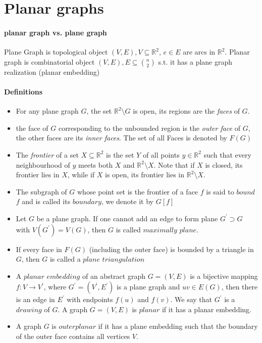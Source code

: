 \section{Planar graphs}

\paragraph{planar graph vs. plane graph}
Plane Graph is topological object $ (V,E), V \subseteq \mathbb{R}^2$, 
$ e \in E $ are arcs in $ \mathbb{R}^2$.
Planar graph is combinatorial object $ (V,E), E \subseteq \binom{n}{2} $ s.t. 
it has a plane graph realization (planar embedding)

\paragraph{Definitions}
\begin{itemize}
    \item For any plane graph $G$, the set $\mathbb{R}^2 \setminus G$ is open,
    its regions are the \textit{faces} of $G$.

    \item the face of $G$ corresponding to the unbounded region is the 
    \textit{outer face} of $G$, the other faces are its \textit{inner faces}.
    The set of all Faces is denoted by $F(G)$

    \item The \textit{frontier} of a set $X \subseteq \mathbb{R}^2$ is the set 
    $Y$ of all points $y \in \mathbb{R}^2$ such that every neighbourhood of $y$
    meets both $X$ and $\mathbb{R}^2 \setminus X$. Note that if $X$ is closed, 
    its frontier lies in $X$, while if $X$ is open, its frontier lies in 
    $\mathbb{R}^2 \setminus X$.

    \item The subgraph of $G$ whose point set is the frontier of a face $f$
    is said to $bound$ $f$ and is called its $boundary$, we denote it by $G[f]$

    \item Let $G$ be a plane graph. If one cannot add an edge to form plane 
    $ G^\prime \supset G$ with $V(G^\prime) = V(G)$, then $G$ is called 
    $maximally$ $plane$.

    \item If every face in $F(G)$ (including the outer face) is bounded by a 
    triangle in $G$, then $G$ is called a $plane$ $triangulation$

    \item A $planar$ $embedding$ of an abstract graph $G = (V,E)$ is a bijective
    mapping $f: V \to V^\prime$, where $G^\prime = (V^\prime, E^\prime)$ is a plane 
    graph and $uv \in E(G)$, then there is an edge in $E^\prime$ with endpoints
    $f(u)$ and $f(v)$. We say that $G^\prime$ is a $drawing$ of $G$.
    A graph $G = (V,E)$ is $planar$ if it has a planar embedding.

    \item A graph $ G $ is $outerplanar$ if it has a plane embedding such that the
    boundary of the outer face contains all vertices $ V $.

\end{itemize}


